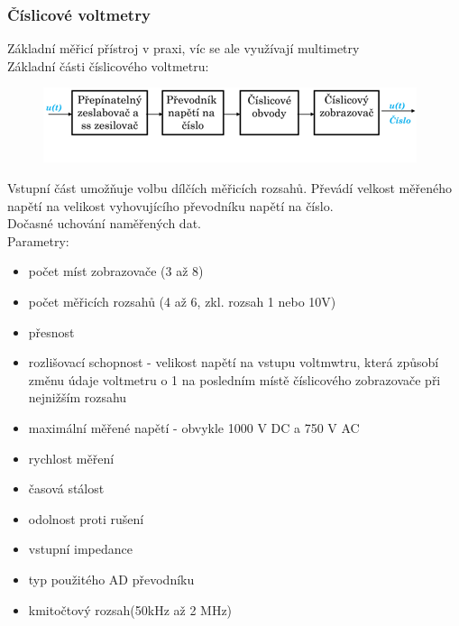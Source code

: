\subsubsection*{Číslicové voltmetry}
Základní měřicí přístroj v praxi, víc se ale využívají multimetry\\
Základní části číslicového voltmetru:
\begin{figure}[H]
    \includegraphics*[scale = 1.5]{images/cislicovy_voltmetr.png}
\end{figure}
Vstupní část umožňuje volbu dílčích měřicích rozsahů. Převádí velkost měřeného napětí na velikost vyhovujícího převodníku napětí na číslo.\\
Dočasné uchování naměřených dat.\\
Parametry:
\begin{itemize}
    \item počet míst zobrazovače (3 až 8\textonehalf)
    \item počet měřicích rozsahů (4 až 6, zkl. rozsah 1 nebo 10V)
    \item přesnost
    \item rozlišovací schopnost - velikost napětí na vstupu voltmwtru, která způsobí změnu údaje voltmetru o 1 na posledním místě číslicového zobrazovače při nejnižším rozsahu
    \item maximální měřené napětí - obvykle 1000 V DC a 750 V AC
    \item rychlost měření
    \item časová stálost
    \item odolnost proti rušení
    \item vstupní impedance
    \item typ použitého AD převodníku
    \item kmitočtový rozsah(50kHz až 2 MHz)
\end{itemize}

